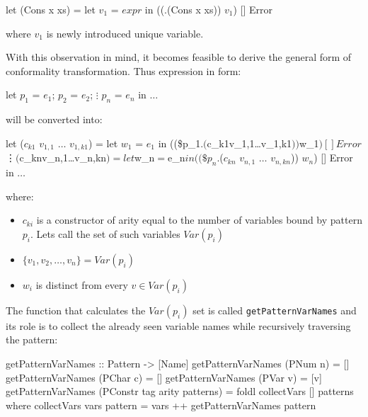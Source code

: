 \documentclass[12pt,a4paper]{report}
\begin{document}
\vspace*{0.2in}
\begin{code}[style=haskell,mathescape=true]
let (Cons x xs) = let $v_{1}$ = $expr$
                  in ((\p.(Cons x xs)) $v_{1}$) [] Error
\end{code}

where $v_{1}$ is newly introduced unique variable.

With this observation in mind, it becomes feasible to derive the general form
of conformality transformation. Thus expression in form:

\vspace*{0.2in}
\begin{code}[style=haskell,mathescape=true]
let $p_{1}$ = $e_{1}$;
    $p_{2}$ = $e_{2}$;
       $\vdots$
    $p_{n}$ = $e_{n}$
in $\ldots$
\end{code}

will be converted into:

\vspace*{0.2in}
\begin{code}[style=haskell,mathescape=true]
let
    ($c_{k1}$ $v_{1,1}$ $\ldots$ $v_{1,k1}$) = let $w_{1}$ = $e_{1}$
                      in ((\$p_{1}$.($c_{k1}$ $v_{1,1}$ $\ldots$ $v_{1,k1}$)) $w_{1}$) [] Error
                               $\vdots$
    ($c_{kn}$ $v_{n,1}$ $\ldots$ $v_{n,kn}$) = let $w_{n}$ = $e_{n}$
                      in ((\$p_{n}$.($c_{kn}$ $v_{n,1}$ $\ldots$ $v_{n,kn}$)) $w_{n}$) [] Error
in $\ldots$
\end{code}

where:
\begin{itemize}
  \item $c_{ki}$ is a constructor of arity equal to the number of variables
    bound by pattern $p_{i}$. Lets call the set of such variables $Var(p_{i})$
  \item $\{v_1, v_2, \ldots, v_n\} = Var(p_i)$
  \item $w_{i}$ is distinct from every $v \in Var(p_i)$
\end{itemize}
The function that calculates the $Var(p_i)$ set is called
\texttt{getPatternVarNames} and its role is to collect the already seen
variable names while recursively traversing the pattern:

\vspace*{0.2in}
\begin{code}[style=haskell]
getPatternVarNames :: Pattern -> [Name]
getPatternVarNames (PNum n) = []
getPatternVarNames (PChar c) = []
getPatternVarNames (PVar v) = [v]
getPatternVarNames (PConstr tag arity patterns) = foldl collectVars [] patterns
    where
        collectVars vars pattern = vars ++ getPatternVarNames pattern
\end{code}
\end{document}
